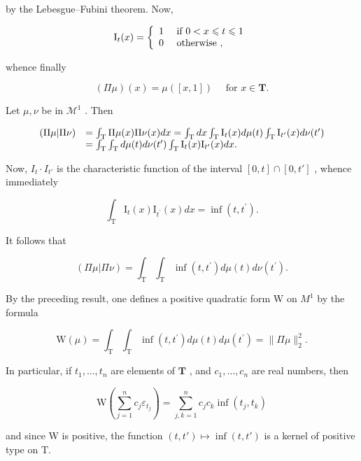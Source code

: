 by the Lebesgue--Fubini theorem. Now,

\[
\mathrm{I} _ {t} (x) = \left\{ \begin{array}{l l} 1 & \text { if } 0 <   x \leqslant t \leqslant 1 \\ 0 & \text { otherwise }, \end{array} \right.
\]

whence finally

\[
(\Pi \mu) (x) = \mu ([ x, 1 ]) \quad \text { for } x \in \mathbf {T}.\tag{34}
\]

Let \(\mu, \nu\) be in \(\mathcal{M}^1\) . Then

\[
\begin{array}{r l} (\Pi \mu | \Pi \nu) & = \int_ {\mathrm{T}} \Pi \mu (x) \Pi \nu (x) d x = \int_ {\mathrm{T}} d x \int_ {\mathrm{T}} \mathrm{I} _ {t} (x) d \mu (t) \int_ {\mathrm{T}} \mathrm{I} _ {t ^ {\prime}} (x) d \nu (t ^ {\prime}) \\ & = \int_ {\mathrm{T}} \int_ {\mathrm{T}} d \mu (t) d \nu (t ^ {\prime}) \int_ {\mathrm{T}} \mathrm{I} _ {t} (x) \mathrm{I} _ {t ^ {\prime}} (x) d x. \end{array}
\]

Now, \(I_{t} \cdot I_{t'}\) is the characteristic function of the interval \([0, t] \cap [0, t']\) , whence immediately

\[
\int_ {\mathrm{T}} \mathrm{I} _ {t} (x) \mathrm{I} _ {t ^ {\prime}} (x) d x = \inf (t, t ^ {\prime}).\tag{35}
\]

It follows that

\[
(\Pi \mu | \Pi \nu) = \int_ {\mathrm{T}} \int_ {\mathrm{T}} \inf (t, t ^ {\prime}) d \mu (t) d \nu (t ^ {\prime}).\tag{36}
\]

By the preceding result, one defines a positive quadratic form W on \(M^{1}\) by the formula

\[
\mathrm{W} (\mu) = \int_ {\mathrm{T}} \int_ {\mathrm{T}} \inf (t, t ^ {\prime}) d \mu (t) d \mu (t ^ {\prime}) = \| \Pi \mu \| _ {2} ^ {2}.\tag{37}
\]

In particular, if \(t_1, \ldots, t_n\) are elements of \(\mathbf{T}\) , and \(c_1, \ldots, c_n\) are real numbers, then

\[
\mathrm{W} \left(\sum_ {j = 1} ^ {n} c _ {j} \varepsilon_ {t _ {j}}\right) = \sum_ {j, k = 1} ^ {n} c _ {j} c _ {k} \inf (t _ {j}, t _ {k})
\]

and since W is positive, the function \((t, t') \mapsto \inf(t, t')\) is a kernel of positive type on T.

